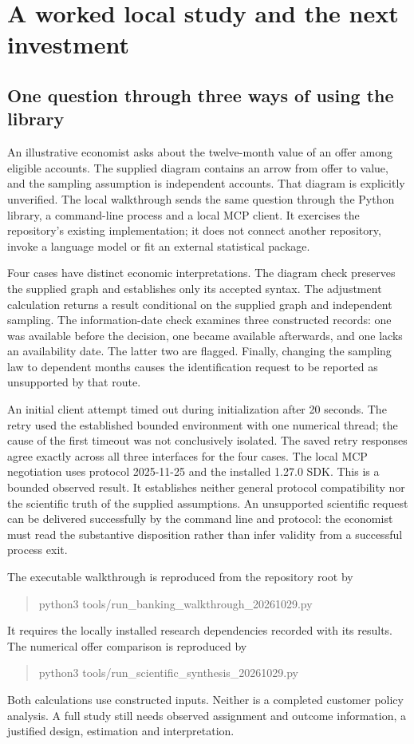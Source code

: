 \chapter{A worked local study and the next investment}
\label{scisyn:investment}

\section{One question through three ways of using the library}
An illustrative economist asks about the twelve-month value of an offer among
eligible accounts. The supplied diagram contains an arrow from offer to value,
and the sampling assumption is independent accounts. That diagram is explicitly
unverified. The local walkthrough sends the same question through the Python
library, a command-line process and a local MCP client. It exercises the
repository's existing implementation; it does not connect another repository,
invoke a language model or fit an external statistical package.

Four cases have distinct economic interpretations. The diagram check preserves
the supplied graph and establishes only its accepted syntax. The adjustment
calculation returns a result conditional on the supplied graph and independent
sampling. The information-date check examines three constructed records:
one was available before the decision, one became available afterwards, and
one lacks an availability date. The latter two are flagged. Finally, changing
the sampling law to dependent months causes the identification request to be
reported as unsupported by that route.

An initial client attempt timed out during initialization after 20 seconds.
The retry used the established bounded environment with one numerical thread;
the cause of the first timeout was not conclusively isolated.
The saved retry responses agree exactly across all three interfaces for the four
cases. The local MCP negotiation uses protocol 2025-11-25 and the installed
1.27.0 SDK. This is a bounded observed result. It establishes neither general
protocol compatibility nor the scientific truth of the supplied assumptions.
An unsupported scientific request can be delivered successfully by the command
line and protocol: the economist must read the substantive disposition rather
than infer validity from a successful process exit.

The executable walkthrough is reproduced from the repository root by
\begin{quote}\small\ttfamily
python3 tools/run\_banking\_walkthrough\_20261029.py
\end{quote}
It requires the locally installed research dependencies recorded with its
results. The numerical offer comparison is reproduced by
\begin{quote}\small\ttfamily
python3 tools/run\_scientific\_synthesis\_20261029.py
\end{quote}
Both calculations use constructed inputs. Neither is a completed customer
policy analysis. A full study still needs observed assignment and outcome
information, a justified design, estimation and interpretation.

